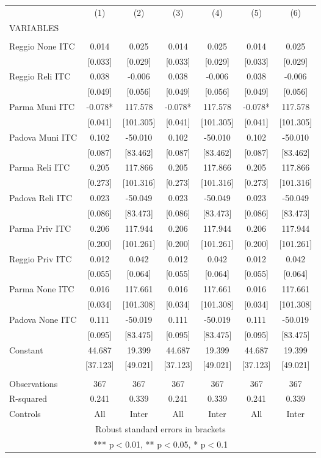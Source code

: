 \begin{tabular}{lcccccc} \hline
 & (1) & (2) & (3) & (4) & (5) & (6) \\
VARIABLES &  &  &  &  &  &  \\ \hline
 &  &  &  &  &  &  \\
Reggio None ITC & 0.014 & 0.025 & 0.014 & 0.025 & 0.014 & 0.025 \\
 & [0.033] & [0.029] & [0.033] & [0.029] & [0.033] & [0.029] \\
Reggio Reli ITC & 0.038 & -0.006 & 0.038 & -0.006 & 0.038 & -0.006 \\
 & [0.049] & [0.056] & [0.049] & [0.056] & [0.049] & [0.056] \\
Parma Muni ITC & -0.078* & 117.578 & -0.078* & 117.578 & -0.078* & 117.578 \\
 & [0.041] & [101.305] & [0.041] & [101.305] & [0.041] & [101.305] \\
Padova Muni ITC & 0.102 & -50.010 & 0.102 & -50.010 & 0.102 & -50.010 \\
 & [0.087] & [83.462] & [0.087] & [83.462] & [0.087] & [83.462] \\
Parma Reli ITC & 0.205 & 117.866 & 0.205 & 117.866 & 0.205 & 117.866 \\
 & [0.273] & [101.316] & [0.273] & [101.316] & [0.273] & [101.316] \\
Padova Reli ITC & 0.023 & -50.049 & 0.023 & -50.049 & 0.023 & -50.049 \\
 & [0.086] & [83.473] & [0.086] & [83.473] & [0.086] & [83.473] \\
Parma Priv ITC & 0.206 & 117.944 & 0.206 & 117.944 & 0.206 & 117.944 \\
 & [0.200] & [101.261] & [0.200] & [101.261] & [0.200] & [101.261] \\
Reggio Priv ITC & 0.012 & 0.042 & 0.012 & 0.042 & 0.012 & 0.042 \\
 & [0.055] & [0.064] & [0.055] & [0.064] & [0.055] & [0.064] \\
Parma None ITC & 0.016 & 117.661 & 0.016 & 117.661 & 0.016 & 117.661 \\
 & [0.034] & [101.308] & [0.034] & [101.308] & [0.034] & [101.308] \\
Padova None ITC & 0.111 & -50.019 & 0.111 & -50.019 & 0.111 & -50.019 \\
 & [0.095] & [83.475] & [0.095] & [83.475] & [0.095] & [83.475] \\
Constant & 44.687 & 19.399 & 44.687 & 19.399 & 44.687 & 19.399 \\
 & [37.123] & [49.021] & [37.123] & [49.021] & [37.123] & [49.021] \\
 &  &  &  &  &  &  \\
Observations & 367 & 367 & 367 & 367 & 367 & 367 \\
R-squared & 0.241 & 0.339 & 0.241 & 0.339 & 0.241 & 0.339 \\
 Controls & All & Inter & All & Inter & All & Inter \\ \hline
\multicolumn{7}{c}{ Robust standard errors in brackets} \\
\multicolumn{7}{c}{ *** p$<$0.01, ** p$<$0.05, * p$<$0.1} \\
\end{tabular}
